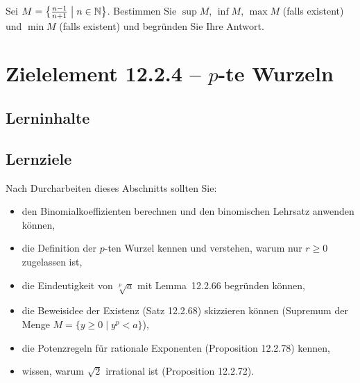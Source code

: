 \documentclass[a4paper,12pt]{article}
\begin{document}
Sei $M = \bigl\{\tfrac{n-1}{n+1} \bigm| n \in \mathbb{N}\bigr\}$.
Bestimmen Sie $\sup M$, $\inf M$, $\max M$ (falls existent) und $\min M$ (falls existent)
und begründen Sie Ihre Antwort.

\newpage

\section*{Zielelement 12.2.4 -- $p$-te Wurzeln}

\subsection*{Lerninhalte}

\begin{center}
\end{center}

\subsection*{Lernziele}

Nach Durcharbeiten dieses Abschnitts sollten Sie:
\begin{itemize}
  \item den Binomialkoeffizienten berechnen und den binomischen Lehrsatz anwenden können,
  \item die Definition der $p$-ten Wurzel kennen und verstehen, warum nur $r \geq 0$
        zugelassen ist,
  \item die Eindeutigkeit von $\sqrt[p]{a}$ mit Lemma~12.2.66 begründen können,
  \item die Beweisidee der Existenz (Satz 12.2.68) skizzieren können (Supremum
        der Menge $M = \{y \geq 0 \mid y^p < a\}$),
  \item die Potenzregeln für rationale Exponenten (Proposition 12.2.78) kennen,
  \item wissen, warum $\sqrt{2}$ irrational ist (Proposition 12.2.72).
\end{itemize}
\end{document}

